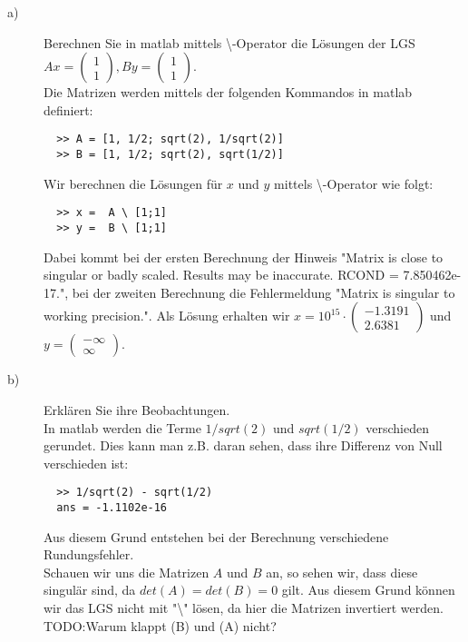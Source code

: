 \documentclass[11pt,a4paper,ngerman]{article}
\begin{document}
\begin{description}

\item[a)] Berechnen Sie in matlab mittels \textbackslash -Operator die Lösungen der LGS \\
          $Ax = \left( \begin{array}{c} 1 \\ 1\end{array}\right), 
           By = \left( \begin{array}{c} 1 \\ 1\end{array}\right)$. \\
            
          Die Matrizen werden mittels der folgenden Kommandos in matlab definiert:          
          \begin{lstlisting}
  >> A = [1, 1/2; sqrt(2), 1/sqrt(2)]
  >> B = [1, 1/2; sqrt(2), sqrt(1/2)]
          \end{lstlisting}
          
          Wir berechnen die Lösungen für $x$ und $y$ mittels \textbackslash -Operator wie folgt:

          \begin{lstlisting}
  >> x =  A \ [1;1]
  >> y =  B \ [1;1]
          \end{lstlisting}

          Dabei kommt bei der ersten Berechnung der Hinweis "Matrix is close to singular or badly scaled. Results may be inaccurate. RCOND = 7.850462e-17.", bei der zweiten Berechnung die Fehlermeldung "Matrix is singular to working precision.".
          Als Lösung erhalten wir
          $x = 10^{15} \cdot \left( \begin{array}{c} -1.3191 \\ 2.6381 \end{array} \right)$ und
          $y = \left( \begin{array}{c} -\infty \\ \infty \end{array} \right)$.

\item[b)] Erklären Sie ihre Beobachtungen. \\

          In matlab werden die Terme $1/sqrt(2)$ und $sqrt(1/2)$ verschieden gerundet.
          Dies kann man z.B. daran sehen, dass ihre Differenz von Null verschieden ist:

          \begin{lstlisting}          
  >> 1/sqrt(2) - sqrt(1/2)
  ans = -1.1102e-16
          \end{lstlisting}
          
          Aus diesem Grund entstehen bei der Berechnung verschiedene Rundungsfehler. \\
          Schauen wir uns die Matrizen $A$ und $B$ an, so sehen wir, dass diese singulär sind,
          da $det(A)=det(B)=0$ gilt. Aus diesem Grund können wir das LGS nicht mit 
          "\textbackslash " lösen, da hier die Matrizen invertiert werden.
          TODO:Warum klappt (B) und (A) nicht?

\end{description}
\end{document}
